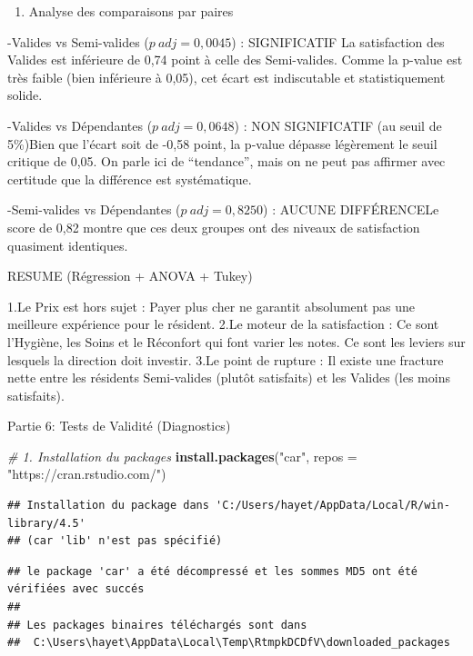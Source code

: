 \documentclass[
]{article}
\newenvironment{Shaded}{\begin{snugshade}}{\end{snugshade}}
\newcommand{\AttributeTok}[1]{\textcolor[rgb]{0.13,0.29,0.53}{#1}}
\newcommand{\CommentTok}[1]{\textcolor[rgb]{0.56,0.35,0.01}{\textit{#1}}}
\newcommand{\FunctionTok}[1]{\textcolor[rgb]{0.13,0.29,0.53}{\textbf{#1}}}
\newcommand{\NormalTok}[1]{#1}
\newcommand{\StringTok}[1]{\textcolor[rgb]{0.31,0.60,0.02}{#1}}
\providecommand{\tightlist}{%
  \setlength{\itemsep}{0pt}\setlength{\parskip}{0pt}}
\begin{document}
\begin{enumerate}
\def\labelenumi{\arabic{enumi}.}
\tightlist
\item
  Analyse des comparaisons par paires
\end{enumerate}

-Valides vs Semi-valides (\(p\ adj = 0,0045\)) : SIGNIFICATIF La
satisfaction des Valides est inférieure de 0,74 point à celle des
Semi-valides. Comme la p-value est très faible (bien inférieure à 0,05),
cet écart est indiscutable et statistiquement solide.

-Valides vs Dépendantes (\(p\ adj = 0,0648\)) : NON SIGNIFICATIF (au
seuil de 5\%)Bien que l'écart soit de -0,58 point, la p-value dépasse
légèrement le seuil critique de 0,05. On parle ici de ``tendance'', mais
on ne peut pas affirmer avec certitude que la différence est
systématique.

-Semi-valides vs Dépendantes (\(p\ adj = 0,8250\)) : AUCUNE DIFFÉRENCELe
score de 0,82 montre que ces deux groupes ont des niveaux de
satisfaction quasiment identiques.

RESUME (Régression + ANOVA + Tukey)

1.Le Prix est hors sujet : Payer plus cher ne garantit absolument pas
une meilleure expérience pour le résident. 2.Le moteur de la
satisfaction : Ce sont l'Hygiène, les Soins et le Réconfort qui font
varier les notes. Ce sont les leviers sur lesquels la direction doit
investir. 3.Le point de rupture : Il existe une fracture nette entre les
résidents Semi-valides (plutôt satisfaits) et les Valides (les moins
satisfaits).

Partie 6: Tests de Validité (Diagnostics)

\begin{Shaded}
\begin{Highlighting}[]
\CommentTok{\# 1. Installation du packages}
\FunctionTok{install.packages}\NormalTok{(}\StringTok{"car"}\NormalTok{, }\AttributeTok{repos =} \StringTok{"https://cran.rstudio.com/"}\NormalTok{)}
\end{Highlighting}
\end{Shaded}

\begin{verbatim}
## Installation du package dans 'C:/Users/hayet/AppData/Local/R/win-library/4.5'
## (car 'lib' n'est pas spécifié)
\end{verbatim}

\begin{verbatim}
## le package 'car' a été décompressé et les sommes MD5 ont été vérifiées avec succés
## 
## Les packages binaires téléchargés sont dans
##  C:\Users\hayet\AppData\Local\Temp\RtmpkDCDfV\downloaded_packages
\end{verbatim}
\end{document}
